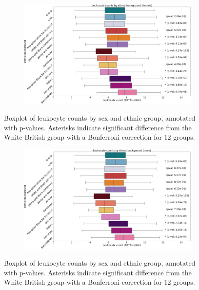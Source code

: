 \documentclass[12pt]{pnas-new}
\begin{document}
\begin{figure}
    \centering
    \begin{subfigure}{\textwidth}
    \includegraphics[width=\textwidth]{images/female_leukocyte_boxplot_annotated.pdf}
    \end{subfigure}
    \caption{Boxplot of leukocyte counts by sex and ethnic group, annotated with p-values. Asterisks indicate significant difference from the White British group with a Bonferroni correction for 12 groups.}
    \label{fig:supp_box_leukocyte_f}
\end{figure}

\begin{figure}
    \centering
    \begin{subfigure}{\textwidth}
    \includegraphics[width=\textwidth]{images/male_leukocyte_boxplot_annotated.pdf}
    \end{subfigure}
    \caption{Boxplot of leukocyte counts by sex and ethnic group, annotated with p-values. Asterisks indicate significant difference from the White British group with a Bonferroni correction for 12 groups.}
    \label{fig:supp_box_leukocyte_m}
\end{figure}
\end{document}
